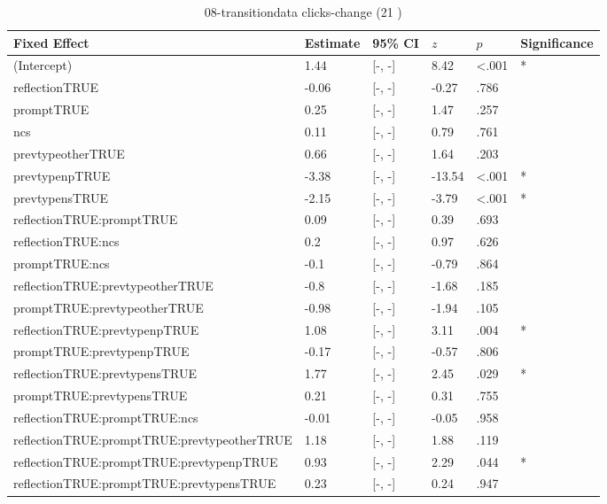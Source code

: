 \documentclass{article}
\begin{document}
\begin{table}[h]
                    \caption{08-transitiondata clicks-change (21 )}
                    \label{label}
                    \centering  \begin{tabular}{llllll}
                 \toprule
                 Fixed Effect     & Estimate     & 95\% CI  & $z$ & $p$ & Significance \\
                 \midrule 
   (Intercept) & 1.44 &  [-, -] & 8.42 & <.001 & * \\ 
   reflectionTRUE & -0.06 &  [-, -] & -0.27 & .786 &   \\ 
   promptTRUE & 0.25 &  [-, -] & 1.47 & .257 &   \\ 
   ncs & 0.11 &  [-, -] & 0.79 & .761 &   \\ 
   prevtypeotherTRUE & 0.66 &  [-, -] & 1.64 & .203 &   \\ 
   prevtypenpTRUE & -3.38 &  [-, -] & -13.54 & <.001 & * \\ 
   prevtypensTRUE & -2.15 &  [-, -] & -3.79 & <.001 & * \\ 
   \cmidrule{1-6}
   reflectionTRUE:promptTRUE & 0.09 &  [-, -] & 0.39 & .693 &   \\ 
   reflectionTRUE:ncs & 0.2 &  [-, -] & 0.97 & .626 &   \\ 
   promptTRUE:ncs & -0.1 &  [-, -] & -0.79 & .864 &   \\ 
   reflectionTRUE:prevtypeotherTRUE & -0.8 &  [-, -] & -1.68 & .185 &   \\ 
   promptTRUE:prevtypeotherTRUE & -0.98 &  [-, -] & -1.94 & .105 &   \\ 
   reflectionTRUE:prevtypenpTRUE & 1.08 &  [-, -] & 3.11 & .004 & * \\ 
   promptTRUE:prevtypenpTRUE & -0.17 &  [-, -] & -0.57 & .806 &   \\ 
   reflectionTRUE:prevtypensTRUE & 1.77 &  [-, -] & 2.45 & .029 & * \\ 
   promptTRUE:prevtypensTRUE & 0.21 &  [-, -] & 0.31 & .755 &   \\ 
   \cmidrule{1-6}
   reflectionTRUE:promptTRUE:ncs & -0.01 &  [-, -] & -0.05 & .958 &   \\ 
   reflectionTRUE:promptTRUE:prevtypeotherTRUE & 1.18 &  [-, -] & 1.88 & .119 &   \\ 
   reflectionTRUE:promptTRUE:prevtypenpTRUE & 0.93 &  [-, -] & 2.29 & .044 & * \\ 
   reflectionTRUE:promptTRUE:prevtypensTRUE & 0.23 &  [-, -] & 0.24 & .947 &   \\ 
   \bottomrule
          \end{tabular}
          \end{table}
\end{document}
